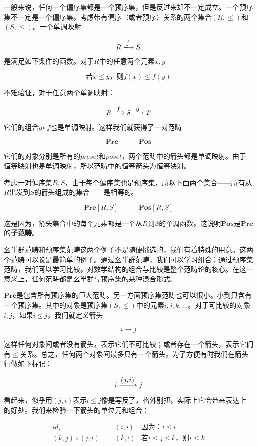 \documentclass{article}
\begin{document}
一般来说，任何一个偏序集都是一个预序集，但是反过来却不一定成立。一个预序集不一定是一个偏序集。考虑带有偏序（或者预序）关系的两个集合$(R, \leq)$和$(S, \leq)$。一个单调映射

\[
R \arrowto{f} S
\]

是满足如下条件的函数。对于$R$中的任意两个元素$x, y$

\[
\text{若} x \leq y \text{，则} f(x) \leq f(y)
\]

不难验证，对于任意两个单调映射：

\[
R \arrowto{f} S \arrowto{g} T
\]

它们的组合$g \circ f$也是单调映射。这样我们就获得了一对范畴

\[
\pmb{Pre} \quad \quad \quad \pmb{Pos}
\]

它们的对象分别是所有的$preset$和$poset$，两个范畴中的箭头都是单调映射。由于恒等映射也是单调映射，所以范畴中的恒等箭头为恒等映射。

考虑一对偏序集$R, S$，由于每个偏序集也是预序集，所以下面两个集合——所有从$R$出发到$S$的箭头组成的集合——是相等的。

\[
\pmb{Pre}[R, S] \quad \quad \quad \pmb{Pos}[R, S]
\]

这是因为，箭头集合中的每个元素都是一个从$R$到$S$的单调函数。这说明$\pmb{Pos}$是$\pmb{Pre}$的\textbf{子范畴}。

幺半群范畴和预序集范畴这两个例子不是随便挑选的，我们有着特殊的用意。这两个范畴可以说是最简单的例子。通过幺半群范畴，我们可以学习组合；通过预序集范畴，我们可以学习比较。对数学结构的组合与比较是整个范畴论的核心。在这一意义上，任何范畴都是幺半群与预序集的某种混合形式\cite{Simmons2011}。

$\pmb{Pre}$是包含所有预序集的巨大范畴。另一方面预序集范畴也可以很小。小到只含有一个预序集。其中的对象是预序集$(S, \leq)$中的元素$i, j, k, ...$。对于可比较的对象$i, j$，如果$i \leq j$，我们就定义箭头

\[
i \longrightarrow j
\]

这样任何对象间或者没有箭头，表示它们不可比较；或者存在一个箭头，表示它们有$\leq$关系。总之，任何两个对象间最多只有一个箭头。为了方便有时我们在箭头行做如下标记：

\[
i \arrowto{(j, i)} j
\]

看起来，似乎用$(j, i)$表示$i \leq j$像是写反了，格外别扭。实际上它会带来表达上的好处。我们来检验一下箭头的单位元和组合：

\[
\begin{array}{rll}
id_i & = (i, i) & \text{因为：} i \leq i \\
(k, j) \circ (j, i) & = (k, i) & \text{若} i \leq j \leq k \text{，则} i \leq k
\end{array}
\]
\end{document}
